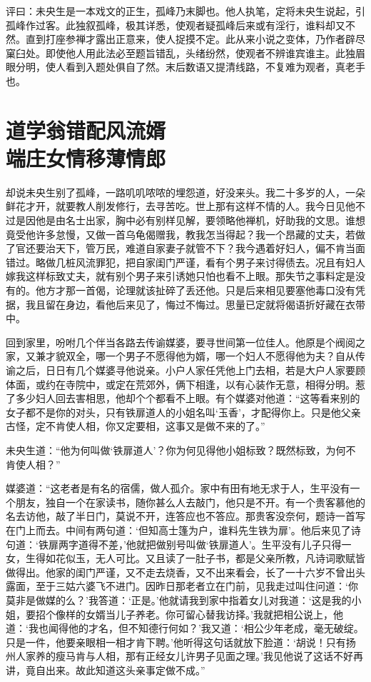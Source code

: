 \documentclass[a4paper,12pt,UTF8,twoside]{ctexbook}
\begin{document}
评曰：未央生是一本戏文的正生，孤峰乃末脚也。他人执笔，定将未央生说起，引孤峰作过客。此独叙孤峰，极其详悉，使观者疑孤峰后来或有淫行，谁料却又不然。直到打座参禅才露出正意来，使人捉摸不定。此从来小说之变体，乃作者辟尽窠臼处。即使他人用此法必至题旨错乱，头绪纷然，使观者不辨谁宾谁主。此独眉眼分明，使人看到入题处俱自了然。末后数语又提清线路，不复难为观者，真老手也。

\chapter[道学翁错配风流婿\ 端庄女情移薄情郎]{道学翁错配风流婿\\端庄女情移薄情郎}

却说未央生别了孤峰，一路叽叽哝哝的埋怨道，好没来头。我二十多岁的人，一朵鲜花才开，就要教人削发修行，去寻苦吃。世上那有这样不情的人。我今日见他不过是因他是由名士出家，胸中必有别样见解，要领略他禅机，好助我的文思。谁想竟受他许多怠慢，又做一首乌龟偈赠我，教我怎当得起？我一个昂藏的丈夫，若做了官还要治天下，管万民，难道自家妻子就管不下？我今遇着好妇人，偏不肯当面错过。略做几桩风流罪犯，把自家闺门严谨，看有个男子来讨得债去。况且有妇人嫁我这样标致丈夫，就有别个男子来引诱她只怕也看不上眼。那失节之事料定是没有的。他方才那一首偈，论理就该扯碎了丢还他。只是后来相见要塞他毒口没有凭据，我且留在身边，看他后来见了，悔过不悔过。思量已定就将偈语折好藏在衣带中。

回到家里，吩咐几个伴当各路去传谕媒婆，要寻世间第一位佳人。他原是个阀阅之家，又兼才貌双全，哪一个男子不愿得他为婿，哪一个妇人不愿得他为夫？自从传谕之后，日日有几个媒婆寻他说亲。小户人家任凭他上门去相，若是大户人家要顾体面，或约在寺院中，或定在荒郊外，俩下相逢，以有心装作无意，相得分明。惹了多少妇人回去害相思，他却个个都看不上眼。有个媒婆对他道：“这等看来别的女子都不是你的对头，只有铁扉道人的小姐名叫‘玉香’，才配得你上。只是他父亲古怪，定不肯使人相，你又定要相，这事又是做不来的了。”

未央生道：“他为何叫做‘铁扉道人’？你为何见得他小姐标致？既然标致，为何不肯使人相？”

媒婆道：“这老者是有名的宿儒，做人孤介。家中有田有地无求于人，生平没有一个朋友，独自一个在家读书，随你甚么人去敲门，他只是不开。有一个贵客慕他的名去访他，敲了半日门，莫说不开，连答应也不答应。那贵客没奈何，题诗一首写在门上而去。中间有两句道：‘但知高士篷为户，谁料先生铁为扉’。他后来见了诗句道：‘铁扉两字道得不差，’他就把做别号叫做‘铁扉道人’。生平没有儿子只得一女，生得如花似玉，无人可比。又且读了一肚子书，都是父亲所教，凡诗词歌赋皆做得出。他家的闺门严谨，又不走去烧香，又不出来看会，长了一十六岁不曾出头露面，至于三姑六婆飞不进门。因昨日那老者立在门前，见我走过叫住问道：‘你莫非是做媒的么？’我答道：‘正是。’他就请我到家中指着女儿对我道：‘这是我的小姐，要招个像样的女婿当儿子养老。你可留心替我访择。’我就把相公说上，他道：‘我也闻得他的才名，但不知德行何如？’我又道：‘相公少年老成，毫无破绽。只是一件，他要亲眼相一相才肯下聘。’他听得这句话就放下脸道：‘胡说！只有扬州人家养的瘦马肯与人相，那有正经女儿许男子见面之理。’我见他说了这话不好再讲，竟自出来。故此知道这头亲事定做不成。”
\end{document}
